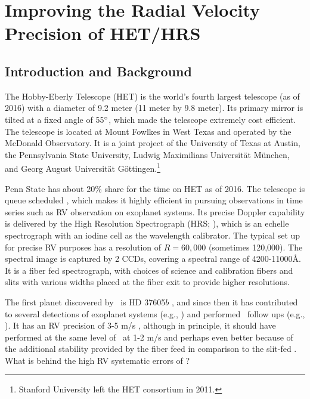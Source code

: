 \chapter{Improving the Radial Velocity Precision of
  HET/HRS}\label{chap:het} 


\section{Introduction and Background}

The Hobby-Eberly Telescope (HET) is the world's fourth largest
telescope (as of 2016) with a diameter of 9.2 meter (11 meter by 9.8
meter). Its primary mirror is tilted at a fixed angle of 55$^{\circ}$,
which made the telescope extremely cost efficient. The telescope is
located at Mount Fowlkes in West Texas and operated by the McDonald
Observatory. It is a joint project of the University of Texas at Austin, the
Pennsylvania State University, Ludwig Maximilians
Universit\"at M\"unchen, and Georg August Universit\"at
G\"ottingen.\footnote{Stanford University left the HET consortium in 2011.}

Penn State has about 20\% share for the time on HET as of 2016. The
telescope is queue scheduled \citep{hetque2007}, which makes it
highly efficient in pursuing observations in time series such as RV
observation on exoplanet systems. Its precise Doppler capability is
delivered by the High Resolution Spectrograph (HRS;
\citealt{1998SPIE.3355..387T}), which is an echelle spectrograph with
an iodine cell as the wavelength calibrator. The typical set up for
precise RV purposes has a resolution of $R=60,000$ (sometimes
120,000). The spectral image is captured by 2 CCDs, covering a spectral
range of 4200-11000\AA. It is a fiber fed spectrograph, with choices
of science and calibration fibers and slits with various widths
placed at the fiber exit to provide higher resolutions.

The first planet discovered by \het\ is HD 37605$b$
\citep{cochran2004}, and since then it has contributed to several
detections of exoplanet systems (e.g.,
\citealt{2007ApJ...665.1407C,2009ApJS..182...97W,2016A&A...585A..73N})
and performed \kepler\ follow ups (e.g.,
\citealt{2014ApJ...795..151E}). It has an RV precision of 3-5 m/s
\citep{2009MNRAS.393..969B}, although in principle, it should have
performed at the same level of \keck\ at 1-2 m/s and perhaps even
better because of the additional stability provided by the fiber
feed in comparison to the slit-fed \keck. What is behind the high RV
systematic errors of \het? 

